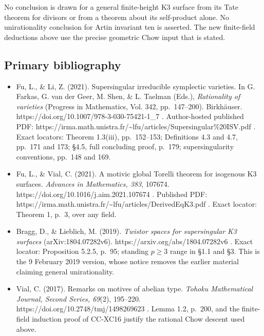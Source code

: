 No conclusion is drawn for a general finite-height K3 surface from its
Tate theorem for divisors or from a theorem about its self-product
alone. No unirationality conclusion for Artin invariant ten is asserted.
The new finite-field deductions above use the precise geometric Chow
input that is stated.

\subsection{Primary bibliography}\label{primary-bibliography}

\begin{itemize}
\tightlist
\item
  Fu, L., \& Li, Z. (2021). Supersingular irreducible symplectic
  varieties. In G. Farkas, G. van der Geer, M. Shen, \& L. Taelman
  (Eds.), \emph{Rationality of varieties} (Progress in Mathematics, Vol.
  342, pp.~147--200). Birkhäuser.
  https://doi.org/10.1007/978-3-030-75421-1\_7 . Author-hosted published
  PDF:
  https://irma.math.unistra.fr/\textasciitilde lfu/articles/Supersingular\%20ISV.pdf
  . Exact locators: Theorem 1.3(iii), pp.~152--153; Definitions 4.3 and
  4.7, pp.~171 and 173; §4.5, full concluding proof, p.~179;
  supersingularity conventions, pp.~148 and 169.
\item
  Fu, L., \& Vial, C. (2021). A motivic global Torelli theorem for
  isogenous K3 surfaces. \emph{Advances in Mathematics, 383}, 107674.
  https://doi.org/10.1016/j.aim.2021.107674 . Published PDF:
  https://irma.math.unistra.fr/\textasciitilde lfu/articles/DerivedEqK3.pdf
  . Exact locator: Theorem 1, p.~3, over any field.
\item
  Bragg, D., \& Lieblich, M. (2019). \emph{Twistor spaces for
  supersingular K3 surfaces} (arXiv:1804.07282v6).
  https://arxiv.org/abs/1804.07282v6 . Exact locator: Proposition 5.2.5,
  p.~95; standing \(p\ge3\) range in §1.1 and §3. This is the 9 February
  2019 version, whose notice removes the earlier material claiming
  general unirationality.
\item
  Vial, C. (2017). Remarks on motives of abelian type. \emph{Tohoku
  Mathematical Journal, Second Series, 69}(2), 195--220.
  https://doi.org/10.2748/tmj/1498269623 . Lemma 1.2, p.~200, and the
  finite-field induction proof of CC-XC16 justify the rational Chow
  descent used above.
\end{itemize}
